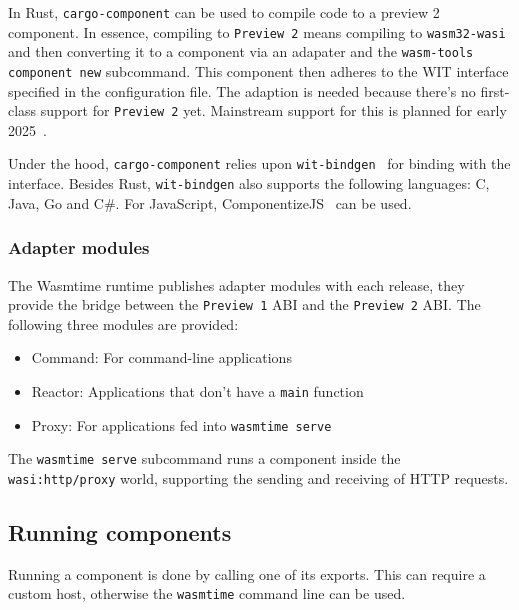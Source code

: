 In Rust, \texttt{cargo-component} can be used to compile code to a preview 2 component. In essence, compiling to \texttt{Preview 2} means compiling to \texttt{wasm32-wasi} and then converting it to a component via an adapater and the \texttt{wasm-tools component new} subcommand. This component then adheres to the \gls{WIT} interface specified in the configuration file. The adaption is needed because there's no first-class support for \texttt{Preview 2} yet. Mainstream support for this is planned for early 2025~\cite{rust:p2}.

Under the hood, \texttt{cargo-component} relies upon \texttt{wit-bindgen}~\cite{gh:wit-bindgen} for binding with the interface. Besides Rust, \texttt{wit-bindgen} also supports the following languages: C, Java, Go and C\#. For JavaScript, ComponentizeJS~\cite{gh:cjs} can be used.

\subsubsection{Adapter modules}

The Wasmtime runtime publishes adapter modules with each release, they provide the bridge between the \texttt{Preview 1} \gls{ABI} and the \texttt{Preview 2} \gls{ABI}. The following three modules are provided:

\begin{itemize}
    \item Command: For command-line applications
    \item Reactor: Applications that don't have a \texttt{main} function
    \item Proxy: For applications fed into \texttt{wasmtime serve}
\end{itemize}

The \texttt{wasmtime serve} subcommand runs a component inside the \texttt{wasi:http/proxy} world, supporting the sending and receiving of HTTP requests.

\subsection{Running components}
\label{sec:host}

Running a component is done by calling one of its exports. This can require a custom host, otherwise the \texttt{wasmtime} command line can be used.

